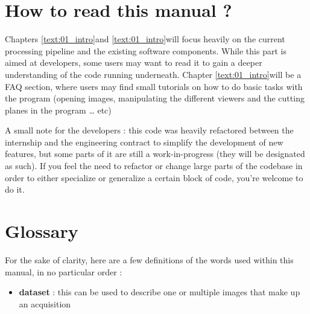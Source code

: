 \section{How to read this manual ?}\label{text:01_intro:02_howtoread}
{

	Chapters \ref{text:01_intro}\footnotemark and \ref{text:01_intro}\footnotemark[\value{footnote}] will focus heavily on the current processing pipeline and the existing software components. While this part is aimed at developers, some users may want to read it to gain a deeper understanding of the code running underneath.
	Chapter \ref{text:01_intro} will be a FAQ section, where users may find small tutorials on how to do basic tasks with the program (opening images, manipulating the different viewers and the cutting planes in the program \ldots{} etc)

	A small note for the developers : this code was heavily refactored between the internship and the engineering contract to simplify the development of new features, but some parts of it are still a work-in-progress (they will be designated as such). If you feel the need to refactor or change large parts of the codebase in order to either specialize or generalize a certain block of code, you're welcome to do it.
}

\section{Glossary}\label{text:01_intro:03_definitions}
{
	For the sake of clarity, here are a few definitions of the words used within this manual, in no particular order :

	\begin{itemize}
		\item \textbf{dataset} : this can be used to describe one or multiple images that make up an acquisition
	\end{itemize}
}

